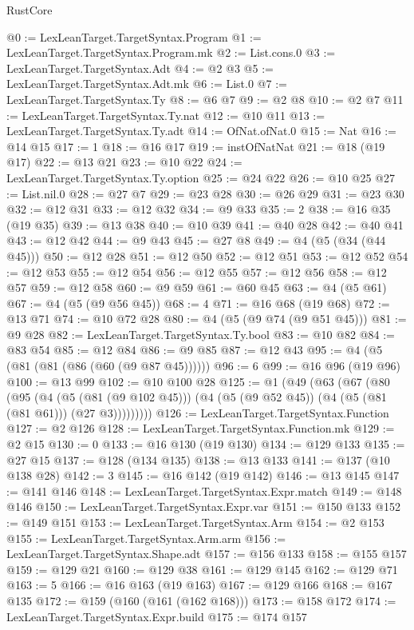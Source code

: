 \begin{lexlean}{RustCore}
\begin{coremodule}
@0 := LexLeanTarget.TargetSyntax.Program
@1 := LexLeanTarget.TargetSyntax.Program.mk
@2 := List.cons.{0}
@3 := LexLeanTarget.TargetSyntax.Adt
@4 := @2 @3
@5 := LexLeanTarget.TargetSyntax.Adt.mk
@6 := List.{0}
@7 := LexLeanTarget.TargetSyntax.Ty
@8 := @6 @7
@9 := @2 @8
@10 := @2 @7
@11 := LexLeanTarget.TargetSyntax.Ty.nat
@12 := @10 @11
@13 := LexLeanTarget.TargetSyntax.Ty.adt
@14 := OfNat.ofNat.{0}
@15 := Nat
@16 := @14 @15
@17 := 1
@18 := @16 @17
@19 := instOfNatNat
@21 := @18 (@19 @17)
@22 := @13 @21
@23 := @10 @22
@24 := LexLeanTarget.TargetSyntax.Ty.option
@25 := @24 @22
@26 := @10 @25
@27 := List.nil.{0}
@28 := @27 @7
@29 := @23 @28
@30 := @26 @29
@31 := @23 @30
@32 := @12 @31
@33 := @12 @32
@34 := @9 @33
@35 := 2
@38 := @16 @35 (@19 @35)
@39 := @13 @38
@40 := @10 @39
@41 := @40 @28
@42 := @40 @41
@43 := @12 @42
@44 := @9 @43
@45 := @27 @8
@49 := @4 (@5 (@34 (@44 @45)))
@50 := @12 @28
@51 := @12 @50
@52 := @12 @51
@53 := @12 @52
@54 := @12 @53
@55 := @12 @54
@56 := @12 @55
@57 := @12 @56
@58 := @12 @57
@59 := @12 @58
@60 := @9 @59
@61 := @60 @45
@63 := @4 (@5 @61)
@67 := @4 (@5 (@9 @56 @45))
@68 := 4
@71 := @16 @68 (@19 @68)
@72 := @13 @71
@74 := @10 @72 @28
@80 := @4 (@5 (@9 @74 (@9 @51 @45)))
@81 := @9 @28
@82 := LexLeanTarget.TargetSyntax.Ty.bool
@83 := @10 @82
@84 := @83 @54
@85 := @12 @84
@86 := @9 @85
@87 := @12 @43
@95 := @4 (@5 (@81 (@81 (@86 (@60 (@9 @87 @45))))))
@96 := 6
@99 := @16 @96 (@19 @96)
@100 := @13 @99
@102 := @10 @100 @28
@125 := @1
    (@49
      (@63
        (@67
          (@80
            (@95
              (@4
                (@5 (@81 (@9 @102 @45)))
                (@4 (@5 (@9 @52 @45)) (@4 (@5 (@81 (@81 @61))) (@27 @3)))))))))
@126 := LexLeanTarget.TargetSyntax.Function
@127 := @2 @126
@128 := LexLeanTarget.TargetSyntax.Function.mk
@129 := @2 @15
@130 := 0
@133 := @16 @130 (@19 @130)
@134 := @129 @133
@135 := @27 @15
@137 := @128 (@134 @135)
@138 := @13 @133
@141 := @137 (@10 @138 @28)
@142 := 3
@145 := @16 @142 (@19 @142)
@146 := @13 @145
@147 := @141 @146
@148 := LexLeanTarget.TargetSyntax.Expr.match
@149 := @148 @146
@150 := LexLeanTarget.TargetSyntax.Expr.var
@151 := @150 @133
@152 := @149 @151
@153 := LexLeanTarget.TargetSyntax.Arm
@154 := @2 @153
@155 := LexLeanTarget.TargetSyntax.Arm.arm
@156 := LexLeanTarget.TargetSyntax.Shape.adt
@157 := @156 @133
@158 := @155 @157
@159 := @129 @21
@160 := @129 @38
@161 := @129 @145
@162 := @129 @71
@163 := 5
@166 := @16 @163 (@19 @163)
@167 := @129 @166
@168 := @167 @135
@172 := @159 (@160 (@161 (@162 @168)))
@173 := @158 @172
@174 := LexLeanTarget.TargetSyntax.Expr.build
@175 := @174 @157

\end{coremodule}
\end{lexlean}

